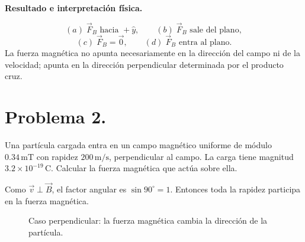 \documentclass[11pt]{article}
\newcommand{\Bentra}[2]{%
    \draw[fieldblue,line width=0.55pt] (#1,#2) circle (0.11);
    \draw[fieldblue,line width=0.55pt] ($(#1,#2)+(-0.065,-0.065)$)--($(#1,#2)+(0.065,0.065)$);
    \draw[fieldblue,line width=0.55pt] ($(#1,#2)+(-0.065,0.065)$)--($(#1,#2)+(0.065,-0.065)$);
}
\begin{document}
\par\medskip\noindent\textbf{Resultado e interpretación física.}\par\smallskip
\begin{equation*}
    \boxed{(a)\;\vec F_B\text{ hacia }+\hat y},
    \qquad
    \boxed{(b)\;\vec F_B\text{ sale del plano}},
\end{equation*}
\begin{equation*}
    \boxed{(c)\;\vec F_B=\vec0},
    \qquad
    \boxed{(d)\;\vec F_B\text{ entra al plano}}.
\end{equation*}
La fuerza magn\'etica no apunta necesariamente en la direcci\'on del campo ni de la velocidad; apunta en la direcci\'on perpendicular determinada por el producto cruz.

\newpage

\section*{Problema 2.}
Una part\'icula cargada entra en un campo magn\'etico uniforme de m\'odulo $0.34\,\mathrm{mT}$ con rapidez $200\,\mathrm{m/s}$, perpendicular al campo. La carga tiene magnitud $3.2\times10^{-19}\,\mathrm C$. Calcular la fuerza magn\'etica que act\'ua sobre ella.

\par\medskip\noindent Como $\vec v\perp\vec B$, el factor angular es $\sin90^\circ=1$. Entonces toda la rapidez participa en la fuerza magn\'etica.\par\medskip 

\begin{figure}[h!]
\centering
{}
\caption{Caso perpendicular: la fuerza magn\'etica cambia la direcci\'on de la part\'icula.}
\end{figure}
\end{document}
